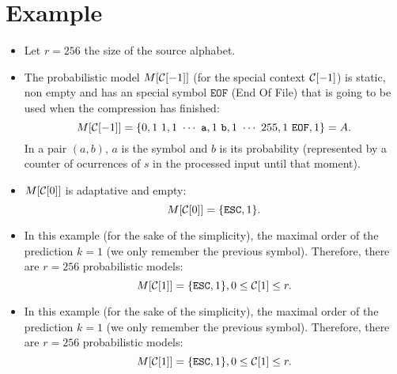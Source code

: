 \section*{Example}
\begin{itemize}
\item Let $r=256$ the size of the source alphabet.
\item The probabilistic model $M[{\cal C}[-1]]$ (for the special context
  ${\cal C}[-1]$) is static, non empty and has an special symbol $\mathtt{EOF}$
  (End Of File) that is going to be used when the compression has
  finished:
  $$M[{\cal C}[-1]]=\{0,1~1,1~\cdots~\mathtt{a},1~\mathtt{b},1~\cdots~255,1~\mathtt{EOF},1\}=A.$$
  In a pair $(a,b)$, $a$ is the symbol and $b$ is its probability (represented by a counter of ocurrences of $s$ in the processed input until that moment).

\item $M[{\cal C}[0]]$ is adaptative and empty:
  $$M[{\cal C}[0]]=\{\mathtt{ESC},1\}.$$

\item In this example (for the sake of the simplicity), the maximal
  order of the prediction $k=1$ (we only remember the previous
  symbol). Therefore, there are $r=256$ probabilistic models:
  $$M[{\cal C}[1]]=\{\mathtt{ESC},1\}, 0\le {\cal C}[1]\le r.$$

\item In this example (for the sake of the simplicity), the maximal
  order of the prediction $k=1$ (we only remember the previous
  symbol). Therefore, there are $r=256$ probabilistic models:
  $$M[{\cal C}[1]]=\{\mathtt{ESC},1\}, 0\le {\cal C}[1]\le r.$$


\end{itemize}
